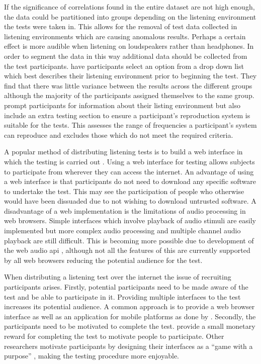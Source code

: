 			If the significance of correlations found in the entire dataset are not high enough, the data could
			be partitioned into groups depending on the listening environment the tests were taken in. This
			allows for the removal of test data collected in listening environments which are causing anomalous
			results. Perhaps a certain effect is more audible when listening on loudspeakers rather than
			headphones. In order to segment the data in this way additional data should be collected from the
			test participants.  \citet{wilmering2013audio} have participants select an option from a drop down
			list which best describes their listening environment prior to beginning the test. They find that
			there was little variance between the results across the different groups although the majority of
			the participants assigned themselves to the same group. \citet{seetharaman2014crowdsourcing} prompt
			participants for information about their listing environment but also include an extra testing
			section to ensure a participant's reproduction system is suitable for the tests. This assesses the
			range of frequencies a participant's system can reproduce and excludes those which do not meet the
			required criteria.
			
			A popular method of distributing listening tests is to build a web interface in which the testing
			is carried out \citep{wilmering2013audio, cartwright2013socialeq, seetharaman2014crowdsourcing}.
			Using a web interface for testing allows subjects to participate from wherever they can access the
			internet. An advantage of using a web interface is that participants do not need to download any
			specific software to undertake the test. This may see the participation of people who otherwise
			would have been dissuaded due to not wishing to download untrusted software. A disadvantage of a
			web implementation is the limitations of audio processing in web browsers. Simple interfaces which
			involve playback of audio stimuli are easily implemented but more complex audio processing and
			multiple channel audio playback are still difficult. This is becoming more possible due to
			development of the web audio \acrshort{api} \citep{adenot2015web}, although not all the features of
			this are currently supported by all web browsers reducing the potential audience for the test.

			When distributing a listening test over the internet the issue of recruiting participants arises.
			Firstly, potential participants need to be made aware of the test and be able to participate in it.
			Providing multiple interfaces to the test increases its potential audience. A common approach is to
			provide a web browser interface as well as an application for mobile platforms as done by
			\citet{huq2010crowdsourcing}. Secondly, the participants need to be motivated to complete the test.
			\citet{cartwright2013socialeq} provide a small monetary reward for completing the test to motivate
			people to participate. Other researchers motivate participants by designing their interfaces as a
			``game with a purpose'' \citep{law2007tagatune, huq2010crowdsourcing, burgoyne2013hooked,
			wolff2014spot}, making the testing procedure more enjoyable.

